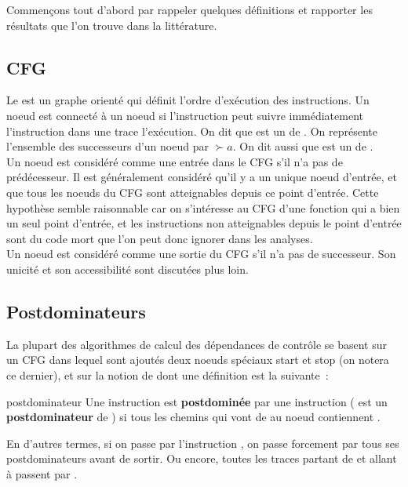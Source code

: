 Commençons tout d'abord par rappeler quelques définitions
et rapporter les résultats que l'on trouve dans la littérature.

\subsection{CFG}

Le  est un graphe orienté qui définit l'ordre
d'exécution des instructions. Un noeud  est connecté à un noeud 
si l'instruction  peut suivre immédiatement
l'instruction  dans une trace l'exécution.
On dit que  est un  de .
On représente l'ensemble des successeurs d'un noeud  par $\succ{a}$.
On dit aussi que  est un  de .\\

Un noeud est considéré comme une entrée dans le CFG s'il n'a pas de prédécesseur.
Il est généralement considéré qu'il y a un unique noeud d'entrée,
et que tous les noeuds du CFG sont atteignables depuis ce point d'entrée.
Cette hypothèse semble raisonnable car on s'intéresse au CFG d'une fonction
qui a bien un seul point d'entrée, et les instructions non atteignables depuis
le point d'entrée sont du
code mort que l'on peut donc ignorer dans les analyses.\\

Un noeud est considéré comme une sortie du CFG s'il n'a pas de successeur.
Son unicité et son accessibilité sont discutées plus loin.


\subsection{Postdominateurs}

La plupart des algorithmes de calcul des dépendances de contrôle
se basent
sur un CFG dans lequel sont ajoutés deux noeuds spéciaux {\sc start} et
{\sc stop} (on notera \nE{} ce dernier),
et sur la notion de   dont une définition est
la suivante~:

\begin{definition}{postdominateur}
  Une instruction  est {\bf postdominée} par une instruction 
  ( est un {\bf postdominateur} de )
  si tous les chemins qui vont de  au noeud \nE{} contiennent .
\end{definition}

En d'autres termes, si on passe par l'instruction ,
on passe forcement par tous ses postdominateurs avant de sortir.
Ou encore,
toutes les traces partant de  et allant à \nE{} passent par .\\


